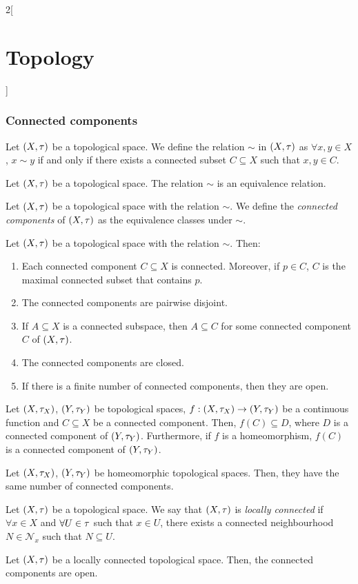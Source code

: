 \documentclass[../../../main.tex]{subfiles}
\begin{document}
\begin{multicols}{2}[\section{Topology}]
  \subsubsection{Connected components}
  \begin{definition}
    Let $(X,\tau)$ be a topological space. We define the relation $\sim$ in $(X,\tau)$ as $\forall x,y\in X$, $x\sim y$ if and only if there exists a connected subset $C\subseteq X$ such that $x,y\in C$.
  \end{definition}
  \begin{prop}
    Let $(X,\tau)$ be a topological space. The relation $\sim$ is an equivalence relation.
  \end{prop}
  \begin{definition}
    Let $(X,\tau)$ be a topological space with the relation $\sim$. We define the \emph{connected components} of $(X,\tau)$ as the equivalence classes under $\sim$.
  \end{definition}
  \begin{prop}
    Let $(X,\tau)$ be a topological space with the relation $\sim$. Then:
    \begin{enumerate}
      \item Each connected component $C\subseteq X$ is connected. Moreover, if $p\in C$, $C$ is the maximal connected subset that contains $p$.
      \item The connected components are pairwise disjoint.
      \item If $A\subseteq X$ is a connected subspace, then $A\subseteq C$ for some connected component $C$ of $(X,\tau)$.
      \item The connected components are closed.
      \item If there is a finite number of connected components, then they are open.
    \end{enumerate}
  \end{prop}
  \begin{theorem}
    Let $(X,\tau_X)$, $(Y,\tau_Y)$ be topological spaces, $f:(X,\tau_X)\rightarrow(Y,\tau_Y)$ be a continuous function and $C\subseteq X$ be a connected component. Then, $f(C)\subseteq D$, where $D$ is a connected component of $(Y,\tau_Y)$. Furthermore, if $f$ is a homeomorphism, $f(C)$ is a connected component of $(Y,\tau_Y)$.
  \end{theorem}
  \begin{corollary}
    Let $(X,\tau_X)$, $(Y,\tau_Y)$ be homeomorphic topological spaces. Then, they have the same number of connected components.
  \end{corollary}
  \begin{definition}
    Let $(X,\tau)$ be a topological space. We say that $(X,\tau)$ is \emph{locally connected} if $\forall x\in X$ and $\forall U\in\tau$ such that $x\in U$, there exists a connected neighbourhood $N\in\mathcal{N}_x$ such that $N\subseteq U$.
  \end{definition}
  \begin{prop}
    Let $(X,\tau)$ be a locally connected topological space. Then, the connected components are open.
  \end{prop}

\end{multicols}
\end{document}
